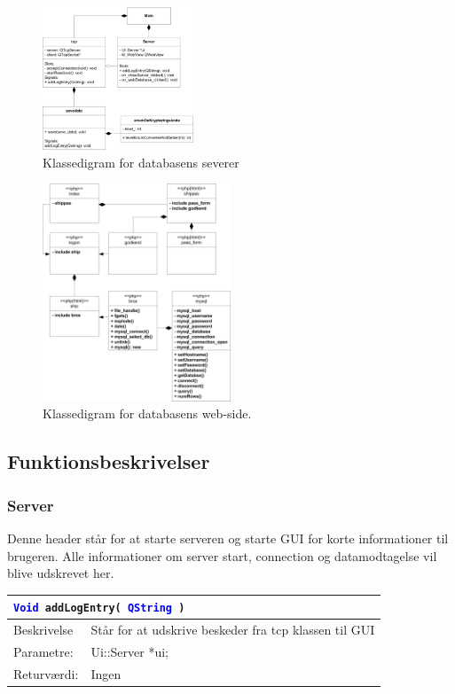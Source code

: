 \begin{figure}[htbp]
	\centering
	\includegraphics[width=0.4\textwidth]{billeder/Database/serverKlassediagram}
	\caption{Klassedigram for databasens severer}
	\label{fig:serverKlassediagram}
\end{figure}

\begin{figure}[H]
	\centering
	\includegraphics[width=0.5\textwidth]{billeder/Database/web_klasse}
	\caption{Klassedigram for databasens web-side.}
	\label{fig:serverKlassediagram}
\end{figure}


\subsection{Funktionsbeskrivelser}
\subsubsection{Server}
Denne header står for at starte serveren og starte GUI for korte informationer til brugeren. Alle informationer om server start, connection og datamodtagelse vil blive udskrevet her. 

\begin{table}[H]
\begin{tabular}{l p{12.5cm}}
\multicolumn{2}{l}{\texttt{\textcolor{blue}{Void} addLogEntry( \textcolor{blue}{QString} )}} \\
\hline
Beskrivelse & Står for at udskrive beskeder fra tcp klassen til GUI \\
Parametre: & Ui::Server *ui;\\
Returværdi:& Ingen\\
\end{tabular}
\end{table}


